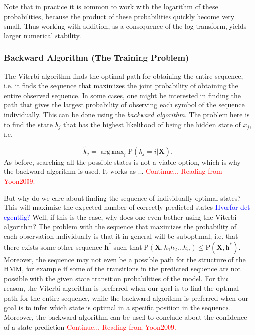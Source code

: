 \documentclass{article}
\DeclareMathOperator*{\argmax}{arg\,max}
\begin{document}
Note that in practice it is common to work with the logarithm of these probabilities, because the product of these probabilities quickly become very small. Thus working with addition, as a consequence of the log-transform, yields larger numerical stability. 

\subsubsection{Backward Algorithm (The Training Problem)}
The Viterbi algorithm finds the optimal path for obtaining the entire sequence, i.e. it finds the sequence that maximizes the joint probability of obtaining the entire observed sequence. In some cases, one might be interested in finding the path that gives the largest probability of observing each symbol of the sequence individually. This can be done using the \textit{backward algorithm}. The problem here is to find the state $h_j$ that has the highest likelihood of being the hidden state of $x_j$, i.e. 

\begin{equation*}
    \hat{h}_j = \argmax_i\text{P}(h_j = i|\textbf{X}).
\end{equation*}
As before, searching all the possible states is not a viable option, which is why the backward algorithm is used. It works as ... \textcolor{red}{Continue... Reading from Yoon2009.}

But why do we care about finding the sequence of individually optimal states? This will maximize the expected number of correctly predicted states \cite{Yoon2009} \textcolor{blue}{Hvorfor det egentlig?} Well, if this is the case, why does one even bother using the Viterbi algorithm? The problem with the sequence that maximizes the probability of each observation individually is that it in general will be suboptimal, i.e. that there exists some other sequence $\mathbf{h}^*$ such that $\text{P}(\mathbf{X}, h_1h_2\ldots h_n) \leq \text{P}(\mathbf{X}, \mathbf{h}^*)$. Moreover, the sequence may not even be a possible path for the structure of the HMM, for example if some of the transitions in the predicted sequence are not possible with the given state transition probabilities of the model. For this reason, the Viterbi algorithm is preferred when our goal is to find the optimal path for the entire sequence, while the backward algorithm is preferred when our goal is to infer which state is optimal in a specific position in the sequence. Moreover, the backward algorithm can be used to conclude about the confidence of a state prediction \textcolor{red}{Continue... Reading from Yoon2009.}
 
\end{document}
